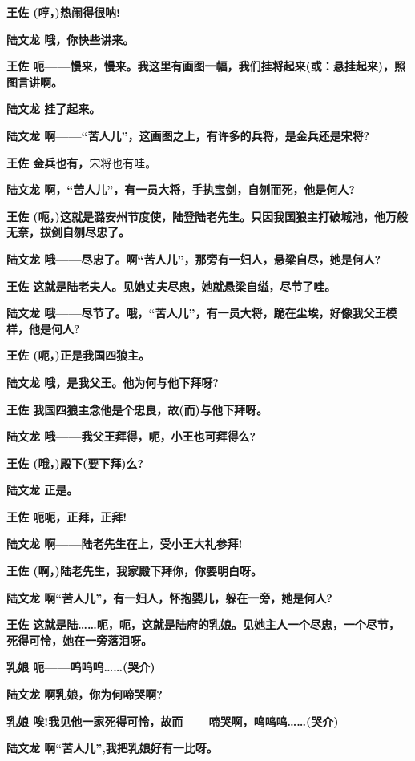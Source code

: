 \textbf{王佐 (哼，)热闹得很呐!}

\textbf{陆文龙 哦，你快些讲来。}

\textbf{王佐
呃------慢来，慢来。我这里有画图一幅，我们挂将起来(或：悬挂起来)，照图言讲啊。}

\textbf{陆文龙 挂了起来。}

\textbf{陆文龙
啊------``苦人儿''，这画图之上，有许多的兵将，是金兵还是宋将?}

\textbf{王佐 金兵也有，}宋将也有哇。

\textbf{陆文龙
啊，``苦人儿''，有一员大将，手执宝剑，自刎而死，他是何人?}

\textbf{王佐
(呃，)这就是潞安州节度使，陆登陆老先生。只因我国狼主打破城池，他万般
无奈，拔剑自刎尽忠了。}

\textbf{陆文龙
哦------尽忠了。啊``苦人儿''，那旁有一妇人，悬梁自尽，她是何人?}

\textbf{王佐 这就是陆老夫人。见她丈夫尽忠，她就悬梁自缢，尽节了哇。}

\textbf{陆文龙
哦------尽节了。哦，``苦人儿''，有一员大将，跪在尘埃，好像我父王模样，他是何人?}

\textbf{王佐 (呃，)正是我国四狼主。}

\textbf{陆文龙 哦，是我父王。他为何与他下拜呀?}

\textbf{王佐 我国四狼主念他是个忠良，故(而)与他下拜呀。}

\textbf{陆文龙 哦------我父王拜得，呃，小王也可拜得么?}

\textbf{王佐 (哦，)殿下(要下拜)么?}

\textbf{陆文龙 正是。}

\textbf{王佐 呃呃，正拜，正拜!}

\textbf{陆文龙 啊------陆老先生在上，受小王大礼参拜!}

\textbf{王佐 (啊，)陆老先生，我家殿下拜你，你要明白呀。}

\textbf{陆文龙 啊``苦人儿''，有一妇人，怀抱婴儿，躲在一旁，她是何人?}

\textbf{王佐
这就是陆\ldots{}\ldots{}呃，呃，这就是陆府的乳娘。见她主人一个尽忠，一个尽节，死得可怜，她在一旁落泪呀。}

\textbf{乳娘 呃------呜呜呜\ldots{}\ldots{}(哭介)}

\textbf{陆文龙 啊乳娘，你为何啼哭啊?}

\textbf{乳娘
唉!我见他一家死得可怜，故而------啼哭啊，呜呜呜\ldots{}\ldots{}(哭介)}

\textbf{陆文龙 啊``苦人儿'',我把乳娘好有一比呀。}

